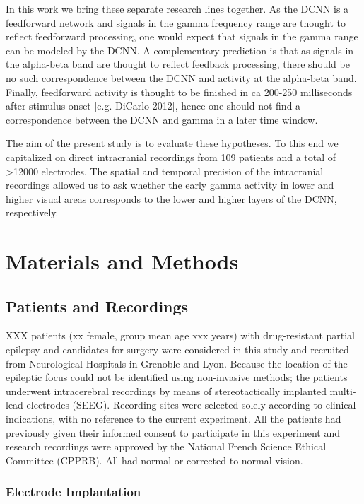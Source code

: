 \documentclass[final]{jneurosci}
\begin{document}
In this work we bring these separate research lines together. As the DCNN is a feedforward network and signals in the gamma frequency range are thought to reflect feedforward processing, one would expect that signals in the gamma range can be modeled by the DCNN. A complementary prediction is that as signals in the alpha-beta band are thought to reflect feedback processing, there should be no such correspondence between the DCNN and activity at the alpha-beta band. Finally, feedforward activity is thought to be finished in ca 200-250 milliseconds after stimulus onset [e.g. DiCarlo 2012], hence one should not find a correspondence between the DCNN and gamma in a later time window.

The aim of the present study is to evaluate these hypotheses. To this end we capitalized on direct intracranial recordings from 109 patients and a total of >12000 electrodes. The spatial and temporal precision of the intracranial recordings allowed us to ask whether the early gamma activity in lower and higher visual areas corresponds to the lower and higher layers of the DCNN, respectively.  


%
%
\section{Materials and Methods}


\subsection{Patients and Recordings}

XXX patients (xx female, group mean age xxx years) with drug-resistant partial epilepsy and candidates for surgery were considered in this study and recruited from Neurological Hospitals in Grenoble and Lyon. Because the location of the epileptic focus could not be identified using non-invasive methods; the patients underwent intracerebral recordings by means of stereotactically implanted multi-lead electrodes (SEEG). Recording sites were selected solely according to clinical indications, with no reference to the current experiment. All the patients had previously given their informed consent to participate in this experiment and research recordings were approved by the National French Science Ethical Committee (CPPRB). All had normal or corrected to normal vision.

\subsubsection{Electrode Implantation}
\end{document}
